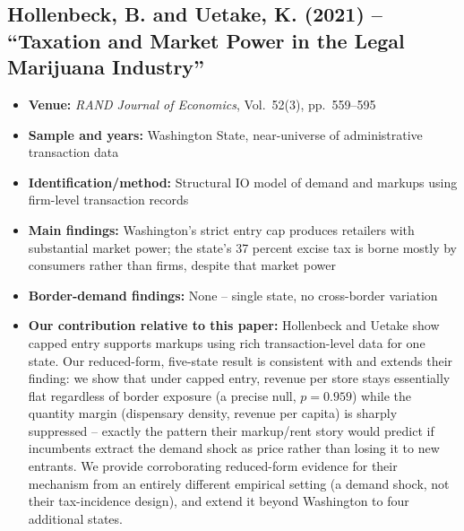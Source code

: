 \documentclass[11pt]{article}
\begin{document}
\subsection{Hollenbeck, B. and Uetake, K. (2021) -- ``Taxation and Market Power in the Legal Marijuana
Industry''}
\begin{itemize}
\item \textbf{Venue:} \emph{RAND Journal of Economics}, Vol.\ 52(3), pp.\ 559--595
\item \textbf{Sample and years:} Washington State, near-universe of administrative transaction data
\item \textbf{Identification/method:} Structural IO model of demand and markups using firm-level transaction
records
\item \textbf{Main findings:} Washington's strict entry cap produces retailers with substantial market power;
the state's 37 percent excise tax is borne mostly by consumers rather than firms, despite that market power
\item \textbf{Border-demand findings:} None -- single state, no cross-border variation
\item \textbf{Our contribution relative to this paper:} Hollenbeck and Uetake show capped entry supports
markups using rich transaction-level data for one state. Our reduced-form, five-state result is consistent
with and extends their finding: we show that under capped entry, revenue per store stays essentially flat
regardless of border exposure (a precise null, $p=0.959$) while the quantity margin (dispensary density,
revenue per capita) is sharply suppressed -- exactly the pattern their markup/rent story would predict if
incumbents extract the demand shock as price rather than losing it to new entrants. We provide corroborating
reduced-form evidence for their mechanism from an entirely different empirical setting (a demand shock,
not their tax-incidence design), and extend it beyond Washington to four additional states.
\end{itemize}
\end{document}
